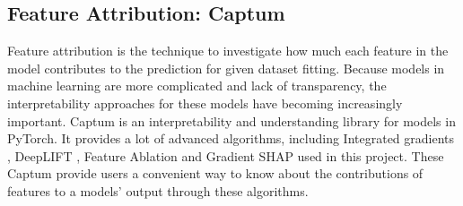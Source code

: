 \documentclass[final-report]{report-template}
\begin{document}
\subsection{Feature Attribution: Captum}
Feature attribution is the technique to investigate how much each feature in the model contributes to the prediction for given dataset fitting. 
Because models in machine learning are more complicated and lack of transparency, the interpretability approaches for these models have becoming increasingly important.
Captum is an interpretability and understanding library for models in PyTorch.
It provides a lot of advanced algorithms, including Integrated gradients \citep{sundararajan2017axiomatic},  DeepLIFT \citep{shrikumar2017learning}, Feature Ablation and Gradient SHAP \citep{lundberg2017unified} used in this project. 
These Captum provide users a convenient way to know about the contributions of features to a models' output through these algorithms.



\end{document}
